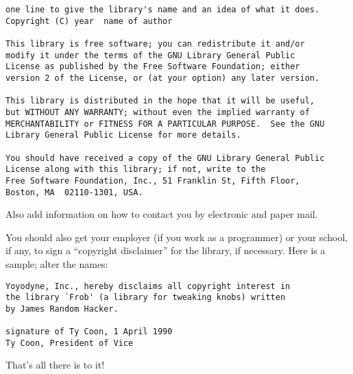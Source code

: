 \documentclass[]{article}
\begin{document}
\begin{verbatim}
one line to give the library's name and an idea of what it does.
Copyright (C) year  name of author

This library is free software; you can redistribute it and/or
modify it under the terms of the GNU Library General Public
License as published by the Free Software Foundation; either
version 2 of the License, or (at your option) any later version.

This library is distributed in the hope that it will be useful,
but WITHOUT ANY WARRANTY; without even the implied warranty of
MERCHANTABILITY or FITNESS FOR A PARTICULAR PURPOSE.  See the GNU
Library General Public License for more details.

You should have received a copy of the GNU Library General Public
License along with this library; if not, write to the
Free Software Foundation, Inc., 51 Franklin St, Fifth Floor,
Boston, MA  02110-1301, USA.
\end{verbatim}

Also add information on how to contact you by electronic and paper mail.

You should also get your employer (if you work as a programmer) or your
school, if any, to sign a ``copyright disclaimer'' for the library, if
necessary. Here is a sample; alter the names:

\begin{verbatim}
Yoyodyne, Inc., hereby disclaims all copyright interest in
the library `Frob' (a library for tweaking knobs) written
by James Random Hacker.

signature of Ty Coon, 1 April 1990
Ty Coon, President of Vice
\end{verbatim}

That's all there is to it!
\end{document}
